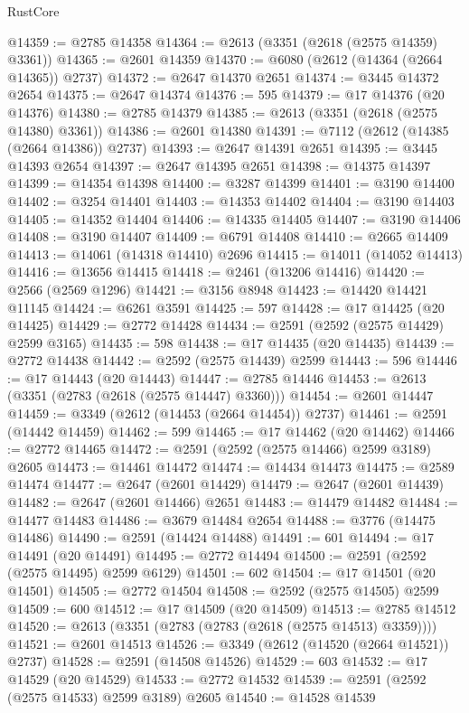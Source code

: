 \begin{lexlean}{RustCore}
\begin{coremodule}
@14359 := @2785 @14358
@14364 := @2613 (@3351 (@2618 (@2575 @14359) @3361))
@14365 := @2601 @14359
@14370 := @6080 (@2612 (@14364 (@2664 @14365)) @2737)
@14372 := @2647 @14370 @2651
@14374 := @3445 @14372 @2654
@14375 := @2647 @14374
@14376 := 595
@14379 := @17 @14376 (@20 @14376)
@14380 := @2785 @14379
@14385 := @2613 (@3351 (@2618 (@2575 @14380) @3361))
@14386 := @2601 @14380
@14391 := @7112 (@2612 (@14385 (@2664 @14386)) @2737)
@14393 := @2647 @14391 @2651
@14395 := @3445 @14393 @2654
@14397 := @2647 @14395 @2651
@14398 := @14375 @14397
@14399 := @14354 @14398
@14400 := @3287 @14399
@14401 := @3190 @14400
@14402 := @3254 @14401
@14403 := @14353 @14402
@14404 := @3190 @14403
@14405 := @14352 @14404
@14406 := @14335 @14405
@14407 := @3190 @14406
@14408 := @3190 @14407
@14409 := @6791 @14408
@14410 := @2665 @14409
@14413 := @14061 (@14318 @14410) @2696
@14415 := @14011 (@14052 @14413)
@14416 := @13656 @14415
@14418 := @2461 (@13206 @14416)
@14420 := @2566 (@2569 @1296)
@14421 := @3156 @8948
@14423 := @14420 @14421 @11145
@14424 := @6261 @3591
@14425 := 597
@14428 := @17 @14425 (@20 @14425)
@14429 := @2772 @14428
@14434 := @2591 (@2592 (@2575 @14429) @2599 @3165)
@14435 := 598
@14438 := @17 @14435 (@20 @14435)
@14439 := @2772 @14438
@14442 := @2592 (@2575 @14439) @2599
@14443 := 596
@14446 := @17 @14443 (@20 @14443)
@14447 := @2785 @14446
@14453 := @2613 (@3351 (@2783 (@2618 (@2575 @14447) @3360)))
@14454 := @2601 @14447
@14459 := @3349 (@2612 (@14453 (@2664 @14454)) @2737)
@14461 := @2591 (@14442 @14459)
@14462 := 599
@14465 := @17 @14462 (@20 @14462)
@14466 := @2772 @14465
@14472 := @2591 (@2592 (@2575 @14466) @2599 @3189) @2605
@14473 := @14461 @14472
@14474 := @14434 @14473
@14475 := @2589 @14474
@14477 := @2647 (@2601 @14429)
@14479 := @2647 (@2601 @14439)
@14482 := @2647 (@2601 @14466) @2651
@14483 := @14479 @14482
@14484 := @14477 @14483
@14486 := @3679 @14484 @2654
@14488 := @3776 (@14475 @14486)
@14490 := @2591 (@14424 @14488)
@14491 := 601
@14494 := @17 @14491 (@20 @14491)
@14495 := @2772 @14494
@14500 := @2591 (@2592 (@2575 @14495) @2599 @6129)
@14501 := 602
@14504 := @17 @14501 (@20 @14501)
@14505 := @2772 @14504
@14508 := @2592 (@2575 @14505) @2599
@14509 := 600
@14512 := @17 @14509 (@20 @14509)
@14513 := @2785 @14512
@14520 := @2613 (@3351 (@2783 (@2783 (@2618 (@2575 @14513) @3359))))
@14521 := @2601 @14513
@14526 := @3349 (@2612 (@14520 (@2664 @14521)) @2737)
@14528 := @2591 (@14508 @14526)
@14529 := 603
@14532 := @17 @14529 (@20 @14529)
@14533 := @2772 @14532
@14539 := @2591 (@2592 (@2575 @14533) @2599 @3189) @2605
@14540 := @14528 @14539

\end{coremodule}
\end{lexlean}

